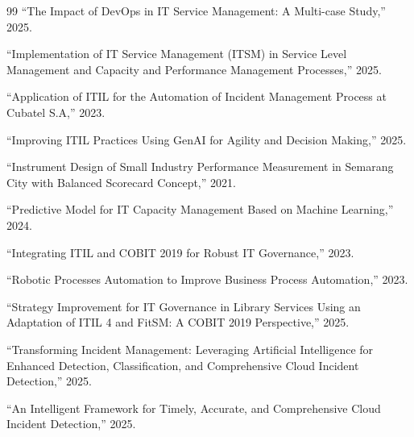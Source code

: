 \documentclass[12pt,a4paper,oneside]{report}
\begin{document}
\begin{thebibliography}{99}
``The Impact of DevOps in IT Service Management: A Multi-case Study,'' 2025.

``Implementation of IT Service Management (ITSM) in Service Level Management and Capacity and Performance Management Processes,'' 2025.

``Application of ITIL for the Automation of Incident Management Process at Cubatel S.A,'' 2023.

``Improving ITIL Practices Using GenAI for Agility and Decision Making,'' 2025.

``Instrument Design of Small Industry Performance Measurement in Semarang City with Balanced Scorecard Concept,'' 2021.

``Predictive Model for IT Capacity Management Based on Machine Learning,'' 2024.

``Integrating ITIL and COBIT 2019 for Robust IT Governance,'' 2023.

``Robotic Processes Automation to Improve Business Process Automation,'' 2023.

``Strategy Improvement for IT Governance in Library Services Using an Adaptation of ITIL 4 and FitSM: A COBIT 2019 Perspective,'' 2025.

``Transforming Incident Management: Leveraging Artificial Intelligence for Enhanced Detection, Classification, and Comprehensive Cloud Incident Detection,'' 2025.

``An Intelligent Framework for Timely, Accurate, and Comprehensive Cloud Incident Detection,'' 2025.

\end{thebibliography}
\end{document}
